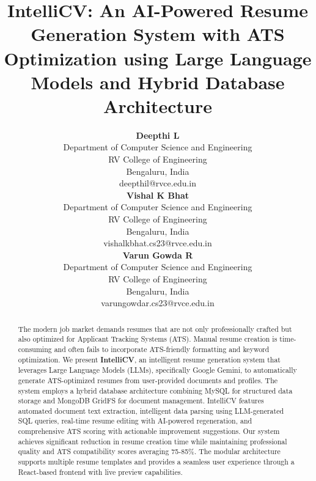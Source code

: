 \documentclass[conference]{IEEEtran}
\begin{document}
\title{IntelliCV: An AI-Powered Resume Generation System with ATS Optimization using Large Language Models and Hybrid Database Architecture}

\author{
\begin{minipage}{0.32\textwidth}
    \centering
    \footnotesize
    \textbf{Deepthi L}\\
    Department of Computer Science and Engineering\\
    RV College of Engineering\\
    Bengaluru, India\\
    deepthil@rvce.edu.in
\end{minipage}
\hfill
\begin{minipage}{0.32\textwidth}
    \centering
    \footnotesize
    \textbf{Vishal K Bhat}\\
    Department of Computer Science and Engineering\\
    RV College of Engineering\\
    Bengaluru, India\\
    vishalkbhat.cs23@rvce.edu.in
\end{minipage}
\hfill
\begin{minipage}{0.32\textwidth}
    \centering
    \footnotesize
    \textbf{Varun Gowda R}\\
    Department of Computer Science and Engineering\\
    RV College of Engineering\\
    Bengaluru, India\\
    varungowdar.cs23@rvce.edu.in
\end{minipage}
}

\maketitle

\begin{abstract}
The modern job market demands resumes that are not only professionally crafted but also optimized for Applicant Tracking Systems (ATS). Manual resume creation is time-consuming and often fails to incorporate ATS-friendly formatting and keyword optimization. We present \textbf{IntelliCV}, an intelligent resume generation system that leverages Large Language Models (LLMs), specifically Google Gemini, to automatically generate ATS-optimized resumes from user-provided documents and profiles. The system employs a hybrid database architecture combining MySQL for structured data storage and MongoDB GridFS for document management. IntelliCV features automated document text extraction, intelligent data parsing using LLM-generated SQL queries, real-time resume editing with AI-powered regeneration, and comprehensive ATS scoring with actionable improvement suggestions. Our system achieves significant reduction in resume creation time while maintaining professional quality and ATS compatibility scores averaging 75-85\%. The modular architecture supports multiple resume templates and provides a seamless user experience through a React-based frontend with live preview capabilities.
\end{abstract}
\end{document}
